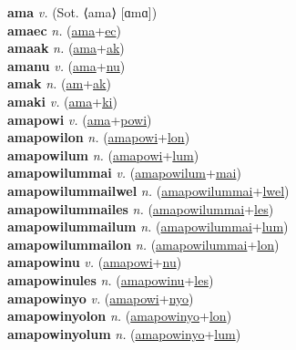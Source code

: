 \textbf{ama} \textit{v.} (Sot. ⟨ama⟩ [ɑmɑ])
 \label{ama} \\
\textbf{amaec} \textit{n.} (\hyperref[ama]{ama}+\hyperref[ec]{ec})
 \label{amaec} \\
\textbf{amaak} \textit{n.} (\hyperref[ama]{ama}+\hyperref[ak]{ak})
 \label{amaak} \\
\textbf{amanu} \textit{v.} (\hyperref[ama]{ama}+\hyperref[nu]{nu})
 \label{amanu} \\
\textbf{amak} \textit{n.} (\hyperref[am]{am}+\hyperref[ak]{ak})
 \label{amak} \\
\textbf{amaki} \textit{v.} (\hyperref[ama]{ama}+\hyperref[ki]{ki})
 \label{amaki} \\
\textbf{amapowi} \textit{v.} (\hyperref[ama]{ama}+\hyperref[powi]{powi})
 \label{amapowi} \\
\textbf{amapowilon} \textit{n.} (\hyperref[amapowi]{amapowi}+\hyperref[lon]{lon})
 \label{amapowilon} \\
\textbf{amapowilum} \textit{n.} (\hyperref[amapowi]{amapowi}+\hyperref[lum]{lum})
 \label{amapowilum} \\
\textbf{amapowilummai} \textit{v.} (\hyperref[amapowilum]{amapowilum}+\hyperref[mai]{mai})
 \label{amapowilummai} \\
\textbf{amapowilummailwel} \textit{n.} (\hyperref[amapowilummai]{amapowilummai}+\hyperref[lwel]{lwel})
 \label{amapowilummailwel} \\
\textbf{amapowilummailes} \textit{n.} (\hyperref[amapowilummai]{amapowilummai}+\hyperref[les]{les})
 \label{amapowilummailes} \\
\textbf{amapowilummailum} \textit{n.} (\hyperref[amapowilummai]{amapowilummai}+\hyperref[lum]{lum})
 \label{amapowilummailum} \\
\textbf{amapowilummailon} \textit{n.} (\hyperref[amapowilummai]{amapowilummai}+\hyperref[lon]{lon})
 \label{amapowilummailon} \\
\textbf{amapowinu} \textit{v.} (\hyperref[amapowi]{amapowi}+\hyperref[nu]{nu})
 \label{amapowinu} \\
\textbf{amapowinules} \textit{n.} (\hyperref[amapowinu]{amapowinu}+\hyperref[les]{les})
 \label{amapowinules} \\
\textbf{amapowinyo} \textit{v.} (\hyperref[amapowi]{amapowi}+\hyperref[nyo]{nyo})
 \label{amapowinyo} \\
\textbf{amapowinyolon} \textit{n.} (\hyperref[amapowinyo]{amapowinyo}+\hyperref[lon]{lon})
 \label{amapowinyolon} \\
\textbf{amapowinyolum} \textit{n.} (\hyperref[amapowinyo]{amapowinyo}+\hyperref[lum]{lum})
